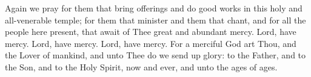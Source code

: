 \begin{liturgicaltext}
    \deacon Again we pray for them that bring offerings and do good works in this holy and all-venerable temple; for them that minister and them that chant, and for all the people here present, that await of Thee great and abundant mercy.
    \choir Lord, have mercy. Lord, have mercy. Lord, have mercy.\pagebreak
    \priest For a merciful God art Thou, and the Lover of mankind, and unto Thee do we send up glory: to the Father, and to the Son, and to the Holy Spirit, now and ever, and unto the ages of ages.
    \choir {}
\end{liturgicaltext}


